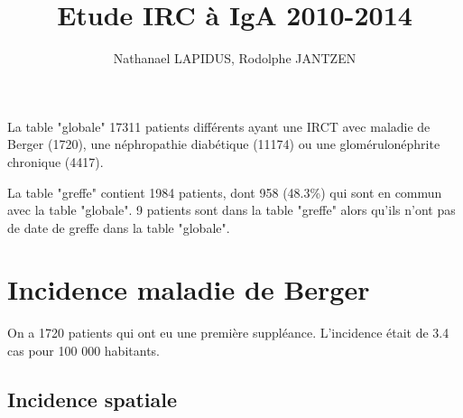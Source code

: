 \documentclass[11pt,a4paper]{article}\usepackage[]{graphicx}\usepackage[]{color}
\author{Nathanael LAPIDUS, Rodolphe JANTZEN}
\title{Etude IRC à IgA 2010-2014}
\begin{document}
\maketitle





La table "globale" 17311 patients différents ayant une IRCT avec maladie de Berger (1720), une néphropathie diabétique (11174) ou une glomérulonéphrite chronique (4417).

La table "greffe" contient 1984 patients, dont 958 (48.3\%) qui sont en commun avec la table "globale". 9 patients sont dans la table "greffe" alors qu'ils n'ont pas de date de greffe dans la table "globale".

\section{Incidence maladie de Berger}

On a 1720 patients qui ont eu une première suppléance. L'incidence était de 3.4 cas pour 100 000 habitants.

  \subsection{Incidence spatiale}
\end{document}

